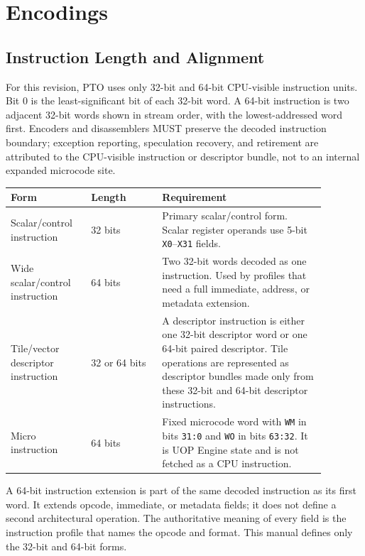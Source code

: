 \chapter{Encodings}
\label{chap:encodings}

\section{Instruction Length and Alignment}
For this revision, PTO uses only 32-bit and 64-bit CPU-visible instruction units. Bit 0 is the least-significant bit of each 32-bit word. A 64-bit instruction is two adjacent 32-bit words shown in stream order, with the lowest-addressed word first. Encoders and disassemblers MUST preserve the decoded instruction boundary; exception reporting, speculation recovery, and retirement are attributed to the CPU-visible instruction or descriptor bundle, not to an internal expanded microcode site.

\begin{longtable}{@{}L{0.22\linewidth}L{0.20\linewidth}L{0.46\linewidth}@{}}
\toprule
Form & Length & Requirement \\
\midrule
Scalar/control instruction & 32 bits & Primary scalar/control form. Scalar register operands use 5-bit \texttt{X0}--\texttt{X31} fields. \\
Wide scalar/control instruction & 64 bits & Two 32-bit words decoded as one instruction. Used by profiles that need a full immediate, address, or metadata extension. \\
Tile/vector descriptor instruction & 32 or 64 bits & A descriptor instruction is either one 32-bit descriptor word or one 64-bit paired descriptor. Tile operations are represented as descriptor bundles made only from these 32-bit and 64-bit descriptor instructions. \\
Micro instruction & 64 bits & Fixed microcode word with \texttt{WM} in bits \texttt{31:0} and \texttt{WO} in bits \texttt{63:32}. It is UOP Engine state and is not fetched as a CPU instruction. \\
\bottomrule
\end{longtable}

A 64-bit instruction extension is part of the same decoded instruction as its first word. It extends opcode, immediate, or metadata fields; it does not define a second architectural operation. The authoritative meaning of every field is the instruction profile that names the opcode and format. This manual defines only the 32-bit and 64-bit forms.

